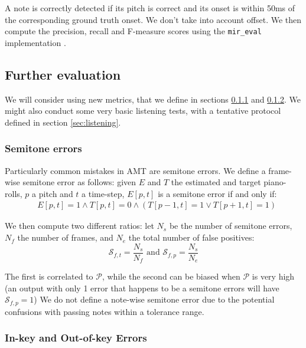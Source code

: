 \documentclass{article}
\begin{document}
A note is correctly detected if its pitch is correct and its onset is within 50ms of the corresponding ground truth onset. We don't take into account offset.
We then compute the precision, recall and F-measure scores using the \texttt{mir\_eval} implementation \citep{raffel2014mireval}.

\subsection{Further evaluation}

We will consider using new metrics, that we define in sections \ref{sec:semitone} and \ref{sec:outkey}.
We might also conduct some very basic listening tests, with a tentative protocol defined in section \ref{sec:listening}.
 
\subsubsection{Semitone errors}
\label{sec:semitone} 


Particularly common mistakes in AMT are semitone errors.
We define a frame-wise semitone error as follows: given $E$ and $T$ the estimated and target piano-rolls, $p$ a pitch and $t$ a time-step, $E[p,t]$ is a semitone error if and only if: 
\vspace{-0.2cm}
\begin{align*}
&E[p,t]= 1 \wedge T[p,t]= 0 \wedge
(T[p-1,t]= 1 \vee T[p+1,t]= 1)
\end{align*}

\vspace{-0.2cm}
We then compute two different ratios: let $N_s$ be the number of semitone errors, $N_f$ the number of frames, and $N_e$ the total number of false positives:
\vspace{-0.2cm}
\[
\mathcal{S}_{f,t} = \frac{N_s}{N_f} \textrm{ and } \mathcal{S}_{f,p} = \frac{N_s}{N_e}
\]

\vspace{-0.2cm}
The first is correlated to $\mathcal{P}$, while the second can be biased when $\mathcal{P}$ is very high (an output with only 1 error that happens to be a semitone errors will have $\mathcal{S}_{f,p}=1$)
%
We do not define a note-wise semitone error due to the potential confusions with passing notes within a tolerance range.

\subsubsection{In-key and Out-of-key Errors}
\label{sec:outkey}
\end{document}
